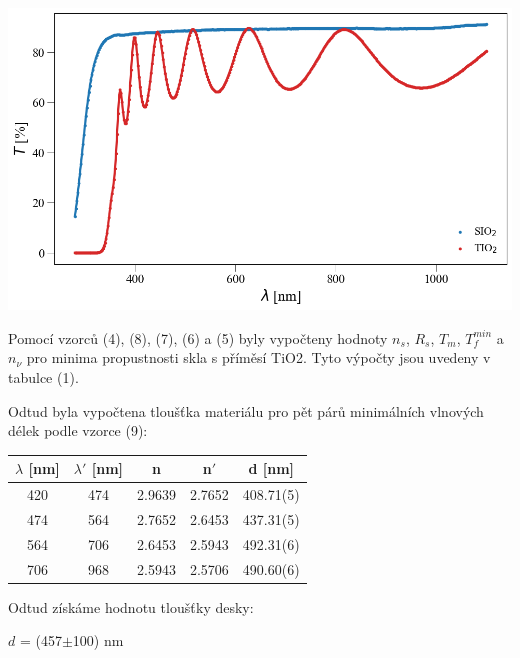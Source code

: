 \documentclass[a4paper,11pt]{article}
\begin{document}
    \begin{minipage}[t]{0.5\textwidth}
                \vspace{-15pt}   
                \par \centering
                \includegraphics[scale=0.35]{sklo}
                \captionsetup{justification=centering, font=footnotesize}
                \label{fig:sklo}
                \vspace{10pt}
                \raggedright
                \par Pomocí vzorců (4), (8), (7), (6) a (5) byly vypočteny hodnoty $n_s$, $R_s$, $T_m$, $T^{min}_f$ a $n_{\nu}$ pro minima propustnosti skla s příměsí TiO2. Tyto výpočty jsou uvedeny v tabulce (1).
                \par Odtud byla vypočtena tloušťka materiálu pro pět párů minimálních vlnových délek podle vzorce (9): 
                \vspace{10pt}
                \par \centering
                \begin{tabular}{|c|c|c|c|c|}
                    \hline
                    $\lambda$ [nm] & $\lambda'$ [nm] & n & n$'$ & d [nm] \\
                    \hline
                    420 & 474 & 2.9639 & 2.7652 & 408.71(5) \\
                    \hline
                    474 & 564 & 2.7652 & 2.6453 & 437.31(5) \\
                    \hline
                    564 & 706 & 2.6453 & 2.5943 & 492.31(6) \\
                    \hline
                    706 & 968 & 2.5943 & 2.5706 & 490.60(6) \\
                    \hline
                \end{tabular}
                \captionsetup{justification=centering, font=footnotesize}
                \vspace{20pt}
                \raggedright
                Odtud získáme hodnotu tloušťky desky: 
                \begin{center}
                    $d$ = (457$\pm$100) nm
                \end{center}

\end{minipage}
\end{document}
